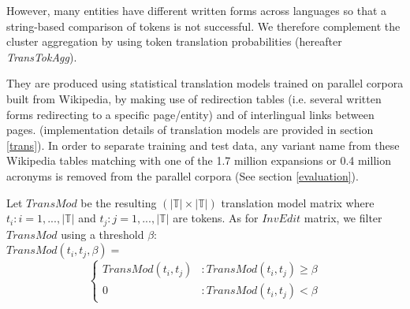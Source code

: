 \documentclass[output=paper]{langsci/langscibook}
\begin{document}
\begin{table}
\centering
{}
\caption{Example of clusters aggregated on the basis of translated tokens.}
\label{tab:translated token aggregation}
\end{table}


However, many entities have different written forms across languages
so that a string-based comparison of tokens is not successful. We
therefore complement the cluster aggregation by using token
translation probabilities (hereafter \textit{TransTokAgg}).

They are produced using statistical translation models trained on
parallel corpora built from Wikipedia, by making use of redirection
tables (i.e.  several written forms redirecting to a specific
page/entity) and of interlingual links between pages. (implementation
details of translation models are provided in section \ref{trans}).
In order to separate training and test data, any variant name from
these Wikipedia tables matching with one of the 1.7 million expansions
or 0.4 million acronyms is removed from the parallel corpora (See
section \ref{evaluation}).

Let $TransMod$ be the resulting $(|\mathbb{T}| \times |\mathbb{T}|)$
translation model matrix where $t_i : i = 1,...,|\mathbb{T}|$ and $t_j
: j = 1,...,|\mathbb{T}|$ are tokens.  As for $InvEdit$ matrix, we
filter $TransMod$ using a threshold $\beta$:\\

$TransMod(t_i,t_j,\beta) =$
\[\left\{
  \begin{array}{lr}
    TransMod(t_i,t_j) & : TransMod(t_i,t_j) \ge \beta\\
    0 & : TransMod(t_i,t_j) < \beta
  \end{array}
\right.
\]
\end{document}
